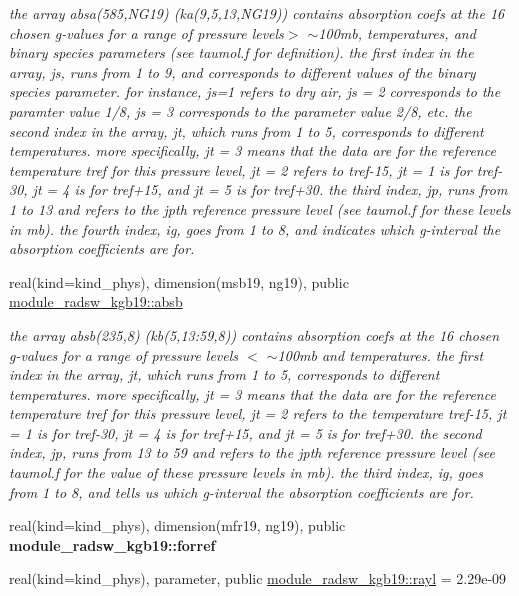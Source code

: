 \begin{Indent}
\begin{DoxyCompactItemize}
\begin{DoxyCompactList}\small\item\em the array absa(585,\+N\+G19) (ka(9,5,13,\+N\+G19)) contains absorption coefs at the 16 chosen g-\/values for a range of pressure levels$>$ $\sim$100mb, temperatures, and binary species parameters (see taumol.\+f for definition). the first index in the array, js, runs from 1 to 9, and corresponds to different values of the binary species parameter. for instance, js=1 refers to dry air, js = 2 corresponds to the paramter value 1/8, js = 3 corresponds to the parameter value 2/8, etc. the second index in the array, jt, which runs from 1 to 5, corresponds to different temperatures. more specifically, jt = 3 means that the data are for the reference temperature tref for this pressure level, jt = 2 refers to tref-\/15, jt = 1 is for tref-\/30, jt = 4 is for tref+15, and jt = 5 is for tref+30. the third index, jp, runs from 1 to 13 and refers to the jpth reference pressure level (see taumol.\+f for these levels in mb). the fourth index, ig, goes from 1 to 8, and indicates which g-\/interval the absorption coefficients are for. \end{DoxyCompactList}\item 
real(kind=kind\+\_\+phys), dimension(msb19, ng19), public \hyperlink{group__module__radsw__kgbnn_gad1171c012a1615c4b98eb3e95276867d}{module\+\_\+radsw\+\_\+kgb19\+::absb}
\begin{DoxyCompactList}\small\item\em the array absb(235,8) (kb(5,13\+:59,8)) contains absorption coefs at the 16 chosen g-\/values for a range of pressure levels $<$ $\sim$100mb and temperatures. the first index in the array, jt, which runs from 1 to 5, corresponds to different temperatures. more specifically, jt = 3 means that the data are for the reference temperature tref for this pressure level, jt = 2 refers to the temperature tref-\/15, jt = 1 is for tref-\/30, jt = 4 is for tref+15, and jt = 5 is for tref+30. the second index, jp, runs from 13 to 59 and refers to the jpth reference pressure level (see taumol.\+f for the value of these pressure levels in mb). the third index, ig, goes from 1 to 8, and tells us which g-\/interval the absorption coefficients are for. \end{DoxyCompactList}\item 
real(kind=kind\+\_\+phys), dimension(mfr19, ng19), public {\bfseries module\+\_\+radsw\+\_\+kgb19\+::forref}
\item 
real(kind=kind\+\_\+phys), parameter, public \hyperlink{group__module__radsw__kgbnn_gac79ad61e8d246d6075664df4201373d7}{module\+\_\+radsw\+\_\+kgb19\+::rayl} = 2.\+29e-\/09

\end{DoxyCompactItemize}
\end{Indent}
